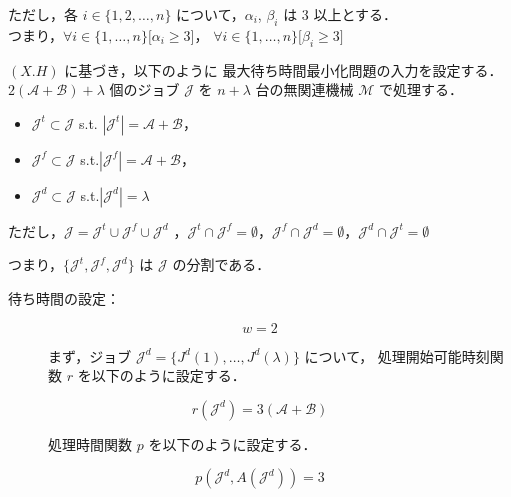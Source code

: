 \documentclass[12pt]{optlab-bachelor}
\begin{document}
ただし，各 $i \in \{1,2,\ldots, n\}$ について，$\alpha_i$, $\beta_i$ は 3 以上とする．\\
つまり，$\forall i \in \{1,\ldots,n\}\big[\alpha_i \ge 3\big]$，
$\forall i \in \{1,\ldots,n\}\big[\beta_i \ge 3\big]$

$(X.H)$ に基づき，以下のように 最大待ち時間最小化問題の入力を設定する．
$2(\mathcal{A} + \mathcal{B}) + \lambda$ 個のジョブ $\mathcal{J}$ を
$n + \lambda$ 台の無関連機械 $\mathcal{M}$ で処理する．
\begin{itemize}
  \item $\mathcal{J}^t \subset \mathcal{J}$ s.t. $|\mathcal{J}^t| =
  \mathcal{A}  + \mathcal{B}$，
  \item $\mathcal{J}^f \subset \mathcal{J}$
  s.t.$|\mathcal{J}^f| = \mathcal{A}  + \mathcal{B}$，
  \item $\mathcal{J}^d \subset \mathcal{J}$ s.t.$|\mathcal{J}^d| =
  \lambda$
\end{itemize}
ただし，$\mathcal{J} = \mathcal{J}^t \cup \mathcal{J}^f \cup
\mathcal{J}^d$ ，$\mathcal{J}^t \cap \mathcal{J}^f = \emptyset$，$\mathcal{J}^f \cap \mathcal{J}^d = \emptyset$，$\mathcal{J}^d \cap \mathcal{J}^t = \emptyset$

つまり，$\{\mathcal{J}^t, \mathcal{J}^f,\mathcal{J}^d\}$ は $\mathcal{J}$ の分割である．

\begin{description}
  \item[待ち時間の設定：]
\end{description}
\begin{displaymath}
  w = 2
\end{displaymath}

\begin{description}
  \item[] まず，ジョブ $\mathcal{J}^d = \{J^d(1),\ldots,J^d({\lambda})\}$ について，
  処理開始可能時刻関数 $r$ を以下のように設定する．
\end{description}
\begin{displaymath}
  r(\mathcal{J}^d) = 3(\mathcal{A} + \mathcal{B})
\end{displaymath}

\begin{description}
  \item[] 処理時間関数 $p$ を以下のように設定する．
\end{description}
\begin{displaymath}
  p(\mathcal{J}^d, A(\mathcal{J}^d)) = 3
\end{displaymath}
\end{document}
